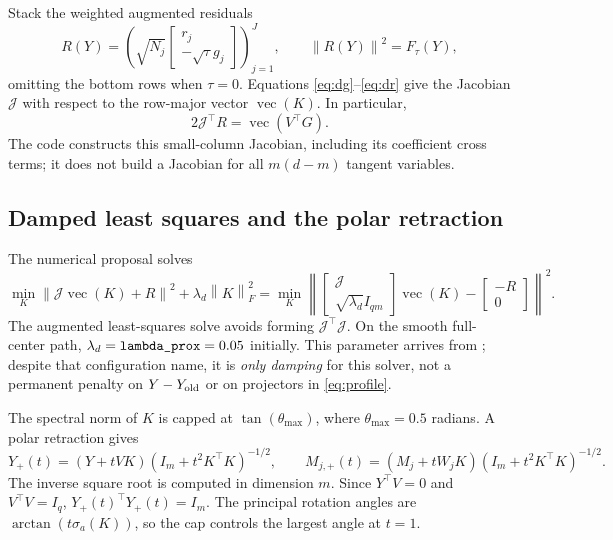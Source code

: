 \documentclass[11pt,a4paper]{article}
\newcommand{\norm}[1]{\left\lVert#1\right\rVert}
\newcommand{\code}[1]{\texttt{\detokenize{#1}}}
\begin{document}
Stack the weighted augmented residuals
\begin{equation}\label{eq:aug-residual}
 R(Y)=\left(\sqrt{N_j}
     \begin{bmatrix}r_j\\-\sqrt\tau g_j\end{bmatrix}\right)_{j=1}^J,
 \qquad \norm{R(Y)}^2=F_\tau(Y),
\end{equation}
omitting the bottom rows when $\tau=0$. Equations \eqref{eq:dg}--\eqref{eq:dr}
give the Jacobian $\mathcal J$ with respect to the row-major vector
$\operatorname{vec}(K)$. In particular,
\begin{equation}\label{eq:jac-gradient}
 2\mathcal J^\top R=\operatorname{vec}(V^\top G).
\end{equation}
The code constructs this small-column Jacobian, including its coefficient
cross terms; it does not build a Jacobian for all $m(d-m)$ tangent variables.

\subsection{Damped least squares and the polar retraction}
The numerical proposal solves
\begin{equation}\label{eq:gn-ls}
 \min_K\norm{\mathcal J\operatorname{vec}(K)+R}^2
       +\lambda_d\norm{K}_F^2
 =\min_K\left\lVert
 \begin{bmatrix}\mathcal J\\\sqrt{\lambda_d}I_{qm}\end{bmatrix}
 \operatorname{vec}(K)-\begin{bmatrix}-R\\0\end{bmatrix}
 \right\rVert^2.
\end{equation}
The augmented least-squares solve avoids forming
$\mathcal J^\top\mathcal J$. On the smooth full-center path,
$\lambda_d=\code{lambda_prox}=0.05$ initially. This parameter arrives from
\code{ADP_Config.lambda_penalty}; despite that configuration name, it is
\emph{only damping} for this solver, not a permanent penalty on
$Y-Y_{\rm old}$ or on projectors in \eqref{eq:profile}.

The spectral norm of $K$ is capped at $\tan(\theta_{\max})$, where
$\theta_{\max}=0.5$ radians. A polar retraction gives
\begin{equation}\label{eq:polar}
 Y_+(t)=(Y+tVK)(I_m+t^2K^\top K)^{-1/2},\qquad
 M_{j,+}(t)=(M_j+tW_jK)(I_m+t^2K^\top K)^{-1/2}.
\end{equation}
The inverse square root is computed in dimension $m$.
Since $Y^\top V=0$ and $V^\top V=I_q$,
$Y_+(t)^\top Y_+(t)=I_m$. The principal rotation angles are
$\arctan(t\sigma_a(K))$, so the cap controls the largest angle at $t=1$.
\end{document}
